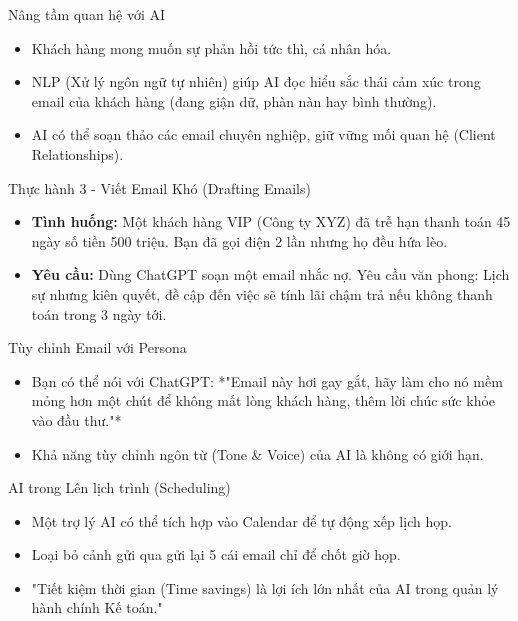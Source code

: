 \documentclass[aspectratio=169]{beamer}
\begin{document}
\begin{frame}{Nâng tầm quan hệ với AI}
    \begin{itemize}
        \item Khách hàng mong muốn sự phản hồi tức thì, cá nhân hóa.
        \item NLP (Xử lý ngôn ngữ tự nhiên) giúp AI đọc hiểu sắc thái cảm xúc trong email của khách hàng (đang giận dữ, phàn nàn hay bình thường).
        \item AI có thể soạn thảo các email chuyên nghiệp, giữ vững mối quan hệ (Client Relationships).
    \end{itemize}
\end{frame}


\begin{frame}{Thực hành 3 - Viết Email Khó (Drafting Emails)}
    \begin{itemize}
        \item \textbf{Tình huống:} Một khách hàng VIP (Công ty XYZ) đã trễ hạn thanh toán 45 ngày số tiền 500 triệu. Bạn đã gọi điện 2 lần nhưng họ đều hứa lèo.
        \item \textbf{Yêu cầu:} Dùng ChatGPT soạn một email nhắc nợ. Yêu cầu văn phong: Lịch sự nhưng kiên quyết, đề cập đến việc sẽ tính lãi chậm trả nếu không thanh toán trong 3 ngày tới.
    \end{itemize}
\end{frame}


\begin{frame}{Tùy chỉnh Email với Persona}
    \begin{itemize}
        \item Bạn có thể nói với ChatGPT: *"Email này hơi gay gắt, hãy làm cho nó mềm mỏng hơn một chút để không mất lòng khách hàng, thêm lời chúc sức khỏe vào đầu thư."*
        \item Khả năng tùy chỉnh ngôn từ (Tone \& Voice) của AI là không có giới hạn.
    \end{itemize}
\end{frame}


\begin{frame}{AI trong Lên lịch trình (Scheduling)}
    \begin{itemize}
        \item Một trợ lý AI có thể tích hợp vào Calendar để tự động xếp lịch họp.
        \item Loại bỏ cảnh gửi qua gửi lại 5 cái email chỉ để chốt giờ họp.
        \item "Tiết kiệm thời gian (Time savings) là lợi ích lớn nhất của AI trong quản lý hành chính Kế toán."
    \end{itemize}
\end{frame}
\end{document}

